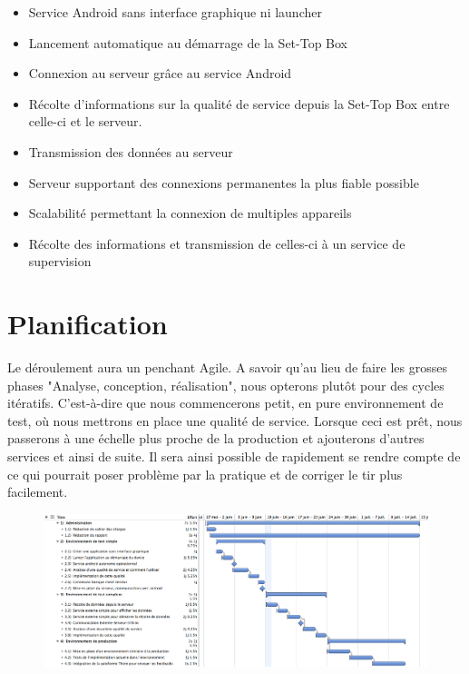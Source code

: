 \documentclass[a4paper, 12pt, svgnames]{report}
\begin{document}
\begin{itemize}
	\item Service Android sans interface graphique ni launcher
	\item Lancement automatique au démarrage de la Set-Top Box
	\item Connexion au serveur grâce au service Android
	\item Récolte d'informations sur la qualité de service depuis la Set-Top Box entre celle-ci et le serveur.
	\item Transmission des données au serveur
	\item Serveur supportant des connexions permanentes la plus fiable possible
	\item Scalabilité permettant la connexion de multiples appareils
	\item Récolte des informations et transmission de celles-ci à un service de supervision
\end{itemize}

\section{Planification}
Le déroulement aura un penchant Agile. A savoir qu'au lieu de faire les grosses phases "Analyse, conception, réalisation", nous opterons plutôt pour des cycles itératifs. C'est-à-dire que nous commencerons petit, en pure environnement de test, où nous mettrons en place une qualité de service. Lorsque ceci est prêt, nous passerons à une échelle plus proche de la production et ajouterons d'autres services et ainsi de suite. Il sera ainsi possible de rapidement se rendre compte de ce qui pourrait poser problème par la pratique et de corriger le tir plus facilement.

\begin{figure}[H]
    \begin{center}
        \centering \includegraphics[width=1.5\linewidth, angle=90]{CDC/planning_bachelor_v2}
    \end{center}
\end{figure}
\end{document}
